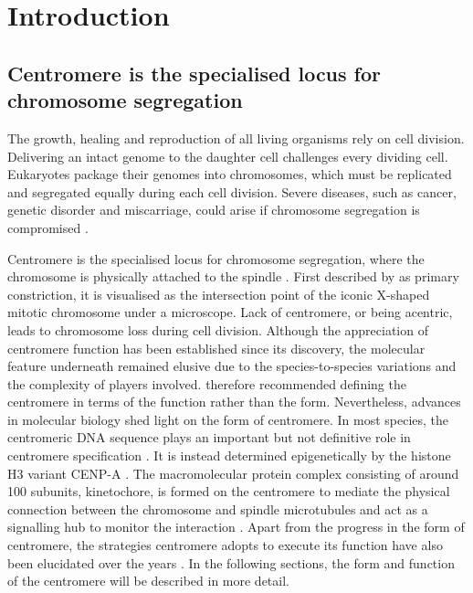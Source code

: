 \chapter{Introduction}
\section{Centromere is the specialised locus for chromosome segregation}

 The growth, healing and reproduction of all living organisms rely on cell division. Delivering an intact genome to the daughter cell challenges every dividing cell. Eukaryotes package their genomes into chromosomes, which must be replicated and segregated equally during each cell division. Severe diseases, such as cancer, genetic disorder and miscarriage, could arise if chromosome segregation is compromised \citep{Jallepalli2001ChromosomeMystery, Draviam2004ChromosomeStability, Wasielak-Politowska2022ChromosomeAging, Losada2014CohesinBeyond}. 
 
 Centromere is the specialised locus for chromosome segregation, where the chromosome is physically attached to the spindle \citep{Westhorpe2015AMaintenance, McKinley2015TheFunction, Talbert2020WhatCentromere, Fukagawa2014}. First described by \cite{Flemming1882ZellsubstanzZelltheilung} as primary constriction, it is visualised as the intersection point of the iconic X-shaped mitotic chromosome under a microscope. Lack of centromere, or being acentric, leads to chromosome loss during cell division. Although the appreciation of centromere function has been established since its discovery, the molecular feature underneath remained elusive due to the species-to-species variations and the complexity of players involved. \cite{Darlington1936TheEnquiry} therefore recommended defining the centromere in terms of the function rather than the form. Nevertheless, advances in molecular biology shed light on the form of centromere. In most species, the centromeric DNA sequence plays an important but not definitive role in centromere specification \citep{Hoffmann2020, Harrington1997FormationMicrochromosomes, Catania2015SequenceChromatin, Iwata-Otsubo2017, Kasinathan2018Non-B-FormCentromeres, Shukla2018CentromereCycle, Logsdon2019, Murillo-Pineda2020}. It is instead determined epigenetically by the histone H3 variant CENP-A \citep{Warburton1997ImmunolocalizationCentromeres, Vafa1997ChromatinPlate, Earnshaw1985ThreeChromosome, Liu2006MappingCells, Regnier2005CENP-ABubR1, Heun2006, Mendiburo2011, Barnhart2011, Logsdon2015}. The macromolecular protein complex consisting of around 100 subunits, kinetochore, is formed on the centromere to mediate the physical connection between the chromosome and spindle microtubules and act as a signalling hub to monitor the interaction \citep{Musacchio2017AFunction, McAinsh2022TheKinetochores, Cheeseman2014TheKinetochore, Hara2018KinetochoreExit}. Apart from the progress in the form of centromere, the strategies centromere adopts to execute its function have also been elucidated over the years \citep{Tanaka2013, Zhou2020EmergentChromosomes}. In the following sections, the form and function of the centromere will be described in more detail. 

